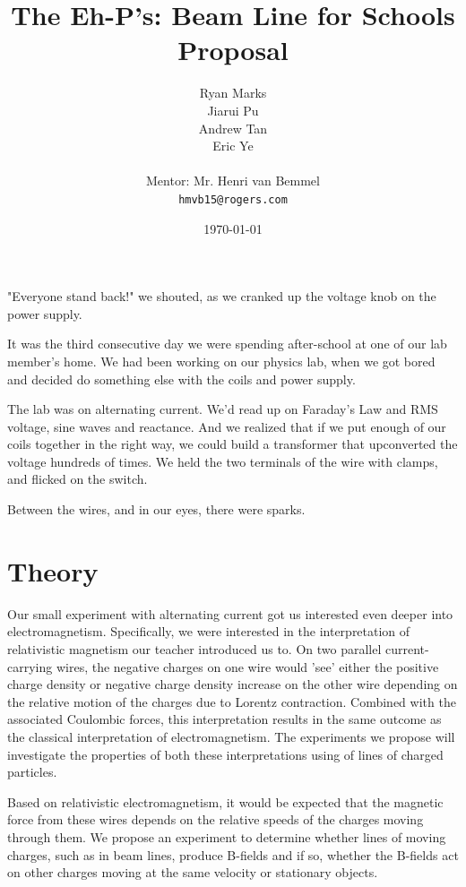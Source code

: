 \documentclass[12pt,letterpaper]{article}
\begin{document}
\title{The Eh-P's: Beam Line for Schools Proposal}
\author{
Ryan Marks\\
Jiarui Pu \\ 
Andrew Tan\\
Eric Ye\\
\\
Mentor: Mr. Henri van Bemmel\\
\normalsize{\texttt{hmvb15@rogers.com}}
}

\date{\today}
\maketitle

"Everyone stand back!" we shouted, as we cranked up the voltage knob on the power supply.

It was the third consecutive day we were spending after-school at one of our lab member’s home. We had been working on our physics lab, when we got bored and decided do something else with the coils and power supply.

The lab was on alternating current. We’d read up on Faraday’s Law and RMS voltage, sine waves and reactance. And we realized that if we put enough of our coils together in the right way, we could build a transformer that upconverted the voltage hundreds of times. We held the two terminals of the wire with clamps, and flicked on the switch.

Between the wires, and in our eyes, there were sparks. 

\section{Theory}
Our small experiment with alternating current got us interested even deeper into electromagnetism. Specifically, we were interested in the interpretation of relativistic magnetism our teacher introduced us to. On two parallel current-carrying wires, the negative charges on one wire would 'see' either the positive charge density or negative charge density increase on the other wire depending on the relative motion of the charges due to Lorentz contraction. Combined with the associated Coulombic forces, this interpretation results in the same outcome as the classical interpretation of electromagnetism. The experiments we propose will investigate the properties of both these interpretations using of lines of charged particles.

Based on relativistic electromagnetism, it would be expected that the magnetic force from these wires depends on the relative speeds of the charges moving through them. We propose an experiment to determine whether lines of moving charges, such as in beam lines, produce B-fields and if so, whether the B-fields act on other charges moving at the same velocity or stationary objects.
\end{document}

